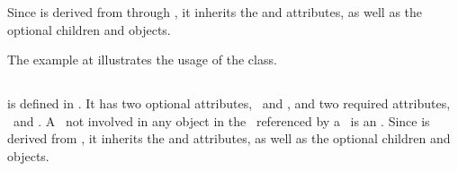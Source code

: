  Since  is derived from  through , it inherits the  and  attributes, as well as the optional children  and  objects. 

The example at  illustrates the usage of the  class.

\clearpage

\subsection{}
\label{def:OutwardBindingSite}

 is defined in . It has two optional attributes, \idAtt\ and \nameAtt, and two required attributes, \bindingStatusAtt\ and \componentAtt. A \bindingSite\ not involved in any \InSpeciesTypeBond object in the \speciesType\ referenced by a \species\ is an \outwardBindingSite.  Since  is derived from , it inherits the  and  attributes, as well as the optional children  and  objects. 


